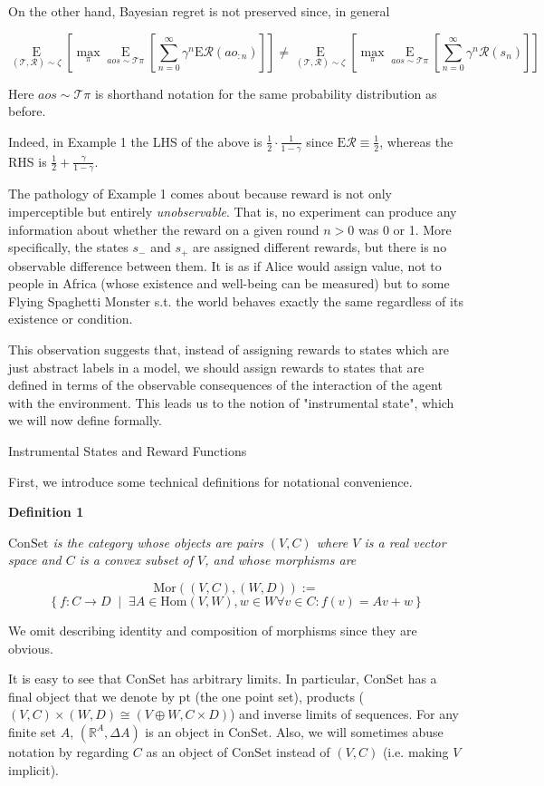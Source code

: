 \documentclass[a4paper]{article}
\newcommand{\Co}[1]{}
\newcommand{\AP}[1]{\left(#1\right)}
\newcommand{\AB}[1]{\left[#1\right]}
\newcommand{\ACM}[2]{\left\{#1\;\middle\vert\;#2\right\}}
\newcommand{\Ea}[2]{\underset{#1}{\operatorname{E}}\AB{#2}}
\newcommand{\Reals}{\mathbb{R}}
\newcommand{\Hom}{\mathrm{Hom}}
\newcommand{\Mor}{\mathrm{Mor}}
\newcommand{\Pt}{\boldsymbol{\mathrm{pt}}}
\newcommand{\R}{\mathcal{R}}
\newcommand{\T}{\mathcal{T}}
\newcommand{\ER}{\mathrm{E}}
\newcommand{\Con}{\boldsymbol{\mathrm{ConSet}}}
\begin{document}
On the other hand, Bayesian regret is not preserved since, in general

$$\Ea{(\T,\R)\sim\zeta}{\max_{\pi}\Ea{aos\sim\T\pi}{\sum_{n=0}^\infty\gamma^n\ER\R\AP{ao_{:n}}}}\ne\Ea{(\T,\R)\sim\zeta}{\max_{\pi}\Ea{aos\sim\T\pi}{\sum_{n=0}^\infty\gamma^n\R\AP{s_n}}}$$

Here $aos\sim\T\pi$ is shorthand notation for the same probability distribution as before.

Indeed, in Example 1 the LHS of the above is $\frac{1}{2}\cdot\frac{1}{1-\gamma}$ since $\ER\R\equiv\frac{1}{2}$, whereas the RHS is $\frac{1}{2}+\frac{\gamma}{1-\gamma}$.

The pathology of Example 1 comes about because reward is not only imperceptible but entirely \textit{unobservable}\Co{i}. That is, no experiment can produce any information about whether the reward on a given round $n > 0$ was 0 or 1. More specifically, the states $s_-$ and $s_+$ are assigned different rewards, but there is no observable difference between them. It is as if Alice would assign value, not to people in Africa (whose existence and well-being can be measured) but to some Flying Spaghetti Monster s.t. the world behaves exactly the same regardless of its existence or condition.

This observation suggests that, instead of assigning rewards to states which are just abstract labels in a model, we should assign rewards to states that are defined in terms of the observable consequences of the interaction of the agent with the environment. This leads us to the notion of "instrumental state", which we will now define formally.

\begin{Large}Instrumental States and Reward Functions\end{Large}

First, we introduce some technical definitions for notational convenience.

\textbf{Definition 1}

\textit{$\Con$ is the category whose objects are pairs $(V,C)$ where $V$ is a real vector space and $C$ is a convex subset of $V$, and whose morphisms are}\Co{i}

$$\Mor\AP{(V,C),(W,D)}:=$$
$$\ACM{f:C\rightarrow D}{\exists A \in \Hom(V,W),w\in W \forall v\in C: f(v)=Av+w}$$

We omit describing identity and composition of morphisms since they are obvious.

It is easy to see that $\Con$ has arbitrary limits. In particular, $\Con$ has a final object that we denote by $\Pt$ (the one point set), products ($(V,C)\times(W,D)\cong(V\oplus W,C\times D)$) and inverse limits of sequences. For any finite set $A$, $\AP{\Reals^A,\Delta A}$ is an object in $\Con$. Also, we will sometimes abuse notation by regarding $C$ as an object of $\Con$ instead of $(V,C)$ (i.e. making $V$ implicit).
\end{document}
